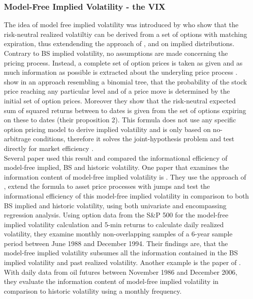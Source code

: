 \subsubsection{Model-Free Implied Volatility - the VIX}\label{sec:223VIX}
The idea of model free implied volatility was introduced by \textcite{britten2000} who show that the risk-neutral realized volatiltiy can be derived from a set of options with matching expiration, thus extendending the approach of \textcite{derman1994} \textcite{dupire1994}, \textcite{dupire1997} and \textcite{rubinstein1994} on implied distributions. Contrary to \ac{BS} implied volatility, no assumptions are made concerning the pricing process. Instead, a complete set of option prices is taken as given and as much information as possible is extracted about the underyling price process \parencite{britten2000}. \\
\textcite{britten2000} show in an approach resembling a binomial tree, that the probability of the stock price reaching any particular level and of a price move is determined by the initial set of option prices. Moreover they show that the risk-neutral expected sum of squared returns between to dates is given from the set of options expiring on these to dates (their proposition 2). This formula does not use any specific option pricing model to derive implied volatility and is only based on no-arbitrage conditions, therefore it solves the joint-hypothesis problem and test directly for market efficiency \parencite{jiang2003}.  \\
Several paper used this result and compared the informational efficiency of model-free implied, \ac{BS} and historic volatility. One paper that examines the information content of model-free implied volatility is \textcite{jiang2003}. They use the approach of \textcite{britten2000}, extend the formula to asset price processes with jumps and test the informational efficiency of this model-free implied volatility in comparison to both \ac{BS} implied and historic volatility, using both univariate and encompassing regression analysis. Using option data from the S\&P 500 for the model-free implied volatility calculation and 5-min returns to calculate daily realized volatility, they examine monthly non-overlapping samples of a 6-year sample period between June 1988 and December 1994. Their findings are, that the model-free implied volatility subsumes all the information contained in the \ac{BS} implied volatility and past realized volatility. Another example is the paper of \textcite{bakanova2010}. With daily data from oil futures between November 1986 and December 2006, they evaluate the information content of model-free implied volatility in comparison to historic volatility using a monthly frequency. 
